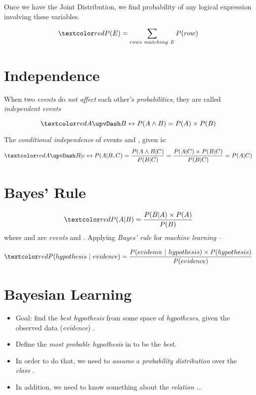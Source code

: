 \documentclass[
	number={3},
	title={Na\"{\i}ive Bayes Learning}
]{cs584notes}
\begin{document}
Once we have the Joint Distribution, we find probability of any logical expression involving these variables.

\[ \data{P(E) = \sum_{rows\ matching\ E}P(row)} \]

\section{Independence}\label{sec:independence}
When two \emph{events} do \emph{not affect} each other's \emph{probabilities}, they are called \emph{independent events}

\[ \data{ A \upvDash B \leftrightarrow P(A\land B) = P(A)\times P(B) } \]

The \emph{conditional independence} of events  and , given  is:
\[ \data{ A \upvDash B | c \leftrightarrow P(A|B,C) = \frac{P(A\land B|C)}{P(B|C)} = \frac{P(A|C)\times P(B|C)}{P(B|C)} = P(A|C) } \]

\section{Bayes' Rule}\label{sec:bayes'-rule}
\begin{equation}
	\data{P(A|B) = \frac{P(B|A)\times P(A)}{P(B)}}
	\label{eq:bayes-rule}
\end{equation}
where  and  are \emph{events} and .
Applying \emph{Bayes' rule} for \emph{machine learning} --

\begin{equation}
	\data{P(hypothesis\ |\ evidence) = \frac{P(evidence\ |\ hypothesis)\times P(hypothesis)}{P(evidence)}}
	\label{eq:bayes-rule-ml}
\end{equation}

\section{Bayesian Learning}\label{sec:bayesian-learning}
\begin{itemize}
	\item Goal: find the \emph{best hypothesis} from some space  of \emph{hypotheses}, given the observed data (\emph{evidence}) .
	\item Define the \emph{most probable hypothesis} in  to be the \emph{best}.
	\item In order to do that, we need to \emph{assume} a \emph{probability distribution} over the \emph{class} .
	\item In addition, we need to know something about the \emph{relation} $\dots$
\end{itemize}
\end{document}
